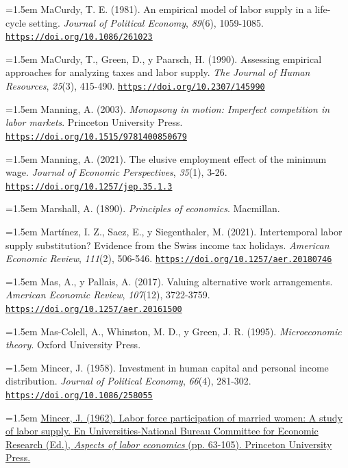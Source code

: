 \documentclass[10pt,a4paper]{article}
\begin{document}
\noindent\hangindent=1.5em MaCurdy, T. E. (1981). An empirical model of labor supply in a life-cycle setting. \textit{Journal of Political Economy}, \textit{89}(6), 1059-1085. \href{https://doi.org/10.1086/261023}{\nolinkurl{https://doi.org/10.1086/261023}}

\noindent\hangindent=1.5em MaCurdy, T., Green, D., y Paarsch, H. (1990). Assessing empirical approaches for analyzing taxes and labor supply. \textit{The Journal of Human Resources}, \textit{25}(3), 415-490. \href{https://doi.org/10.2307/145990}{\nolinkurl{https://doi.org/10.2307/145990}}

\noindent\hangindent=1.5em Manning, A. (2003). \textit{Monopsony in motion: Imperfect competition in labor markets}. Princeton University Press. \href{https://doi.org/10.1515/9781400850679}{\nolinkurl{https://doi.org/10.1515/9781400850679}}

\noindent\hangindent=1.5em Manning, A. (2021). The elusive employment effect of the minimum wage. \textit{Journal of Economic Perspectives}, \textit{35}(1), 3-26. \href{https://doi.org/10.1257/jep.35.1.3}{\nolinkurl{https://doi.org/10.1257/jep.35.1.3}}

\noindent\hangindent=1.5em Marshall, A. (1890). \textit{Principles of economics}. Macmillan.

\noindent\hangindent=1.5em Martínez, I. Z., Saez, E., y Siegenthaler, M. (2021). Intertemporal labor supply substitution? Evidence from the Swiss income tax holidays. \textit{American Economic Review}, \textit{111}(2), 506-546. \href{https://doi.org/10.1257/aer.20180746}{\nolinkurl{https://doi.org/10.1257/aer.20180746}}

\noindent\hangindent=1.5em Mas, A., y Pallais, A. (2017). Valuing alternative work arrangements. \textit{American Economic Review}, \textit{107}(12), 3722-3759. \href{https://doi.org/10.1257/aer.20161500}{\nolinkurl{https://doi.org/10.1257/aer.20161500}}

\noindent\hangindent=1.5em Mas-Colell, A., Whinston, M. D., y Green, J. R. (1995). \textit{Microeconomic theory}. Oxford University Press.

\noindent\hangindent=1.5em Mincer, J. (1958). Investment in human capital and personal income distribution. \textit{Journal of Political Economy}, \textit{66}(4), 281-302. \href{https://doi.org/10.1086/258055}{\nolinkurl{https://doi.org/10.1086/258055}}

\noindent\hangindent=1.5em \href{https://www.nber.org/books-and-chapters/aspects-labor-economics/labor-force-participation-married-women-study-labor-supply}{Mincer, J. (1962). Labor force participation of married women: A study of labor supply. En Universities-National Bureau Committee for Economic Research (Ed.), \textit{Aspects of labor economics} (pp. 63-105). Princeton University Press.}
\end{document}
